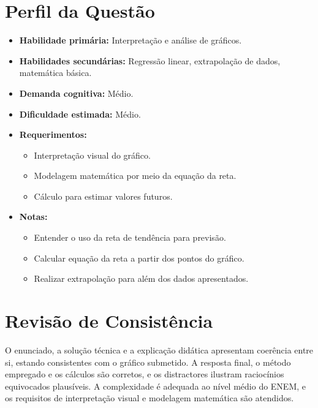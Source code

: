 \documentclass{article}
\begin{document}
\section*{Perfil da Questão}

\begin{itemize}
  \item \textbf{Habilidade primária:} Interpretação e análise de gráficos.
  \item \textbf{Habilidades secundárias:} Regressão linear, extrapolação de dados, matemática básica.
  \item \textbf{Demanda cognitiva:} Médio.
  \item \textbf{Dificuldade estimada:} Médio.
  \item \textbf{Requerimentos:}
    \begin{itemize}
      \item Interpretação visual do gráfico.
      \item Modelagem matemática por meio da equação da reta.
      \item Cálculo para estimar valores futuros.
    \end{itemize}
  \item \textbf{Notas:}
    \begin{itemize}
      \item Entender o uso da reta de tendência para previsão.
      \item Calcular equação da reta a partir dos pontos do gráfico.
      \item Realizar extrapolação para além dos dados apresentados.
    \end{itemize}
\end{itemize}

\section*{Revisão de Consistência}

O enunciado, a solução técnica e a explicação didática apresentam coerência entre si, estando consistentes com o gráfico submetido. A resposta final, o método empregado e os cálculos são corretos, e os distractores ilustram raciocínios equivocados plausíveis. A complexidade é adequada ao nível médio do ENEM, e os requisitos de interpretação visual e modelagem matemática são atendidos.
\end{document}
